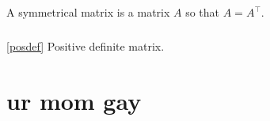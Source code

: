 \documentclass{report}
\begin{document}
\section{}

\subsection{}

A symmetrical matrix is a matrix $A$ so that $A=A^\top$.

\subsection{}

\ref{posdef} Positive definite matrix.

\chapter{}

\chapter{ur mom gay}
\end{document}
